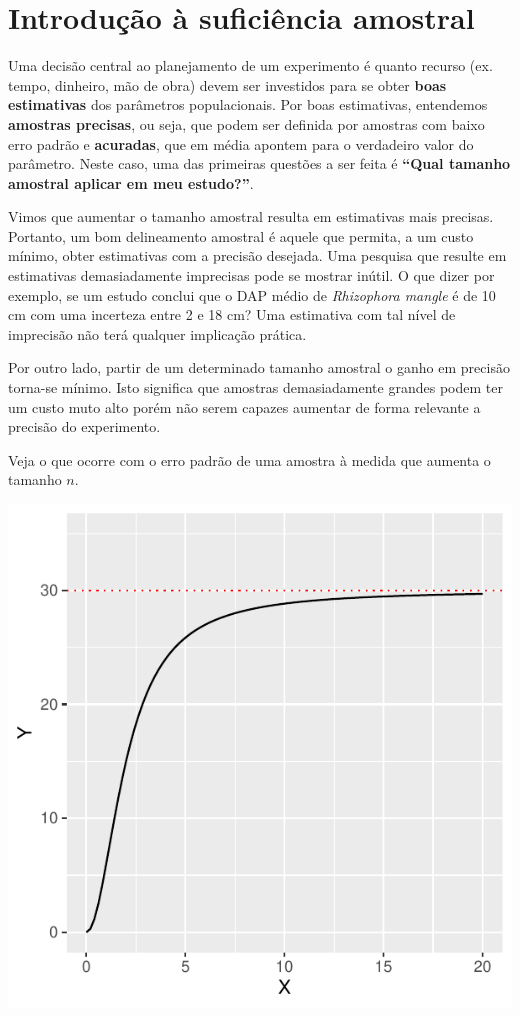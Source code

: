 \documentclass[
]{book}
\begin{document}
\hypertarget{introduuxe7uxe3o-uxe0-suficiuxeancia-amostral}{%
\section{Introdução à suficiência amostral}\label{introduuxe7uxe3o-uxe0-suficiuxeancia-amostral}}

Uma decisão central ao planejamento de um experimento é quanto recurso (ex. tempo, dinheiro, mão de obra) devem ser investidos para se obter \textbf{boas estimativas} dos parâmetros populacionais. Por boas estimativas, entendemos \textbf{amostras precisas}, ou seja, que podem ser definida por amostras com baixo erro padrão e \textbf{acuradas}, que em média apontem para o verdadeiro valor do parâmetro. Neste caso, uma das primeiras questões a ser feita é \textbf{``Qual tamanho amostral aplicar em meu estudo?''}.

Vimos que aumentar o tamanho amostral resulta em estimativas mais precisas. Portanto, um bom delineamento amostral é aquele que permita, a um custo mínimo, obter estimativas com a precisão desejada. Uma pesquisa que resulte em estimativas demasiadamente imprecisas pode se mostrar inútil. O que dizer por exemplo, se um estudo conclui que o DAP médio de \emph{Rhizophora mangle} é de 10 cm com uma incerteza entre 2 e 18 cm? Uma estimativa com tal nível de imprecisão não terá qualquer implicação prática.

Por outro lado, partir de um determinado tamanho amostral o ganho em precisão torna-se mínimo. Isto significa que amostras demasiadamente grandes podem ter um custo muto alto porém não serem capazes aumentar de forma relevante a precisão do experimento.

Veja o que ocorre com o erro padrão de uma amostra à medida que aumenta o tamanho \(n\).

\includegraphics{probest-cambientais_files/figure-latex/unnamed-chunk-122-1.pdf}
\end{document}

